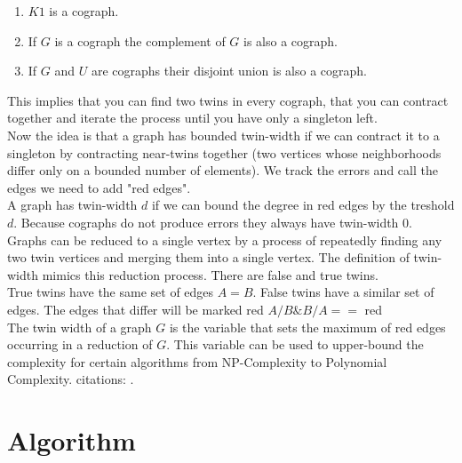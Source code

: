 \documentclass[10pt]{article}
\begin{document}
\begin{enumerate}
	\item $K1$ is a cograph.
	\item If $G$ is a cograph the complement of $G$ is also a cograph.
	\item If $G$ and $U$ are cographs their disjoint union is also a cograph.
\end{enumerate}

This implies that you can find two twins in every cograph, that you can contract together
and iterate the process until you have only a singleton left.\\
Now the idea is that a graph has bounded twin-width if we can contract it to a singleton
by contracting near-twins together (two vertices whose neighborhoods differ only on a
bounded number of elements). We track the errors and call the edges we need to
add "red edges".\\
A graph has twin-width $d$ if we can bound the degree in red edges by the treshold $d$.
Because cographs do not produce errors they always have twin-width $0$. \\

Graphs can be reduced to a single vertex by a process of repeatedly finding any two
twin vertices and merging them into a single vertex. The definition of twin-width mimics
this reduction process. There are false and true twins.\\
True twins have the same set of edges $A = B$. False twins have a similar set of edges. The
edges that differ will be marked red ${A / B \& B/A} ==$ red\\
The twin width of a graph $G$ is the variable that sets the maximum of red edges occurring in a
reduction of $G$. This variable can be used to upper-bound the complexity for
certain algorithms from NP-Complexity to Polynomial Complexity. citations:
\cite{bonnet2021twini} \cite{bonnet2021twinii}.

\section{Algorithm}
\end{document}
